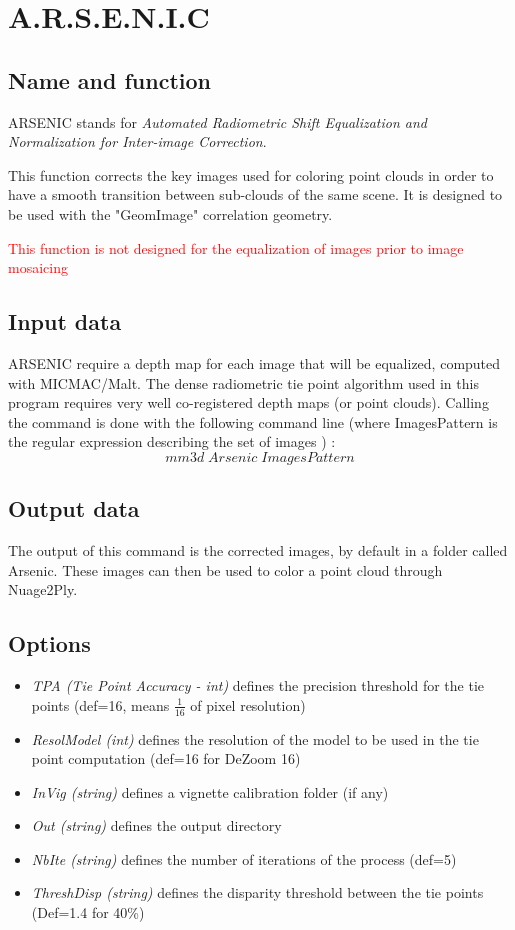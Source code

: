 \section{A.R.S.E.N.I.C}
\label{A.R.S.E.N.I.C.}
\subsection{Name and function}
ARSENIC stands for \textit{Automated Radiometric Shift Equalization and Normalization for Inter-image Correction}.


This function corrects the key images used for coloring point clouds in order to have a smooth transition between sub-clouds of the same scene. It is designed to be used with the "GeomImage" correlation geometry.


\textcolor{red}{ This function is not designed for the equalization of images prior to image mosaicing}

\subsection{Input data}
\label{inputArsenic}

ARSENIC require a depth map for each image that will be equalized, computed with MICMAC/Malt. The dense radiometric tie point algorithm used in this program requires very well co-registered depth maps (or point clouds).
Calling the command is done with the following command line (where ImagesPattern is the regular expression describing the set of images ) :\[mm3d\;Arsenic\;ImagesPattern\]

\subsection{Output data}
The output of this command is the corrected images, by default in a folder called Arsenic. These images can then be used to color a point cloud through Nuage2Ply.

\subsection{Options}
\begin{itemize}
\item{\textit{TPA (Tie Point Accuracy - int)} defines the precision threshold for the tie points (def=16, means $\frac{1}{16}$ of pixel resolution)}
\item{\textit{ResolModel (int)} defines the resolution of the model to be used in the tie point computation (def=16 for DeZoom 16)}
\item{\textit{InVig (string)} defines a vignette calibration folder (if any)}
\item{\textit{Out (string)} defines the output directory}
\item{\textit{NbIte (string)} defines the number of iterations of the process (def=5)}
\item{\textit{ThreshDisp (string)} defines the disparity threshold between the tie points (Def=1.4 for 40\%)}
\end{itemize}

